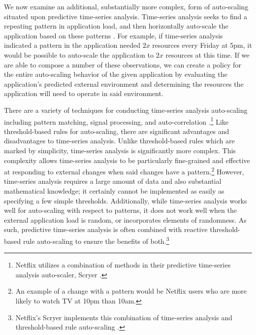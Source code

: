 We now examine an additional, substantially more complex, form of auto-scaling
situated upon predictive time-series analysis. Time-series analysis seeks to
find a repeating pattern in application load, and then horizontally auto-scale
the application based on these
patterns
\cite{auto-scaling-techniques-for-elastic-applications-in-cloud-environments}.
For example, if time-series analysis indicated a pattern in the application needed
$2x$ resources every Friday at 5pm,
it would be possible to auto-scale the application to $2x$
resources at this time. If we are able to compose a number of these
observations, we can create a policy for the entire auto-scaling behavior of
the given application by evaluating the application's predicted external environment
and determining the resources the application will need to operate in said
environment.

There are a variety of techniques for conducting time-series analysis
auto-scaling including pattern matching, signal processing, and
auto-correlation
\cite{auto-scaling-techniques-for-elastic-applications-in-cloud-environments}.\footnote{Netflix utilizes a combination of methods in
their predictive time-series analysis auto-scaler,
Scryer \cite{netflix-scryer-part-ii}.}
Like threshold-based rules for auto-scaling, there are significant
advantages and disadvantages to time-series analysis. Unlike threshold-based
rules which are marked by simplicity, time-series analysis is significantly more
complex. This complexity allows time-series analysis to be particularly
fine-grained and effective
at responding to external changes when said changes have a pattern.\footnote{An
example of a change with a pattern would be Netflix users who are more likely to
watch TV at 10pm than 10am.} However, time-series analysis requires a
large amount of data and also substantial mathematical
knowledge; it certainly cannot be implemented as easily as specifying a few
simple thresholds. Additionally, while time-series analysis works well for
auto-scaling with respect to patterns, it does not work well when the external
application load is random, or incorporates elements of randomness. As such,
predictive time-series analysis is
often combined with reactive threshold-based rule auto-scaling to ensure the benefits of
both.\footnote{Netflix's Scryer implements this combination of
time-series analysis and threshold-based rule
auto-scaling \cite{netflix-scryer-part-ii}.}

